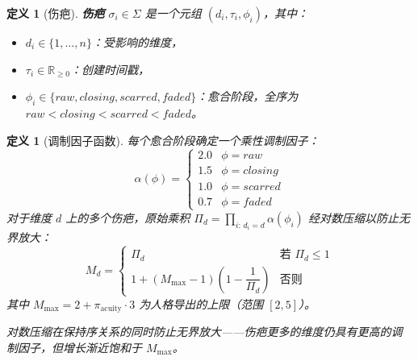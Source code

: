 \documentclass[11pt]{article}
\newtheorem{definition}[theorem]{定义}
\begin{document}
\begin{definition}[伤疤]
\label{def:scar}
\textbf{伤疤} $\sigma_i \in \Sigma$ 是一个元组 $(d_i, \tau_i, \phi_i)$，其中：
\begin{itemize}
\item $d_i \in \{1, \ldots, n\}$：受影响的维度，
\item $\tau_i \in \mathbb{R}_{\geq 0}$：创建时间戳，
\item $\phi_i \in \{raw, closing, scarred, faded\}$：愈合阶段，全序为 $raw < closing < scarred < faded$。
\end{itemize}
\end{definition}

\begin{definition}[调制因子函数]
\label{def:modifier}
每个愈合阶段确定一个乘性调制因子：
\begin{equation}
\alpha(\phi) = \begin{cases} 2.0 & \phi = raw \\ 1.5 & \phi = closing \\ 1.0 & \phi = scarred \\ 0.7 & \phi = faded \end{cases}
\end{equation}
对于维度 $d$ 上的多个伤疤，原始乘积 $\Pi_d = \prod_{i:\, d_i = d} \alpha(\phi_i)$ 经对数压缩以防止无界放大：
\begin{equation}
M_d = \begin{cases}
\Pi_d & \text{若 } \Pi_d \leq 1 \\[4pt]
1 + (M_{\max} - 1)\left(1 - \dfrac{1}{\Pi_d}\right) & \text{否则}
\end{cases}
\end{equation}
其中 $M_{\max} = 2 + \pi_{\text{acuity}} \cdot 3$ 为人格导出的上限（范围 $[2, 5]$）。

对数压缩在保持序关系的同时防止无界放大——伤疤更多的维度仍具有更高的调制因子，但增长渐近饱和于 $M_{\max}$。
\end{definition}
\end{document}
